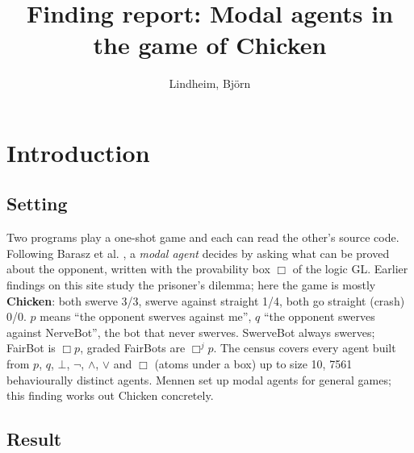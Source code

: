 \documentclass{article}
\title{Finding report: Modal agents in the game of Chicken}
\author{Lindheim, Björn}
\date{}
\begin{document}
\maketitle
\section{Introduction}
\label{sec:chicken-modal-agents}

\subsection*{Setting}

Two programs play a one-shot game and each can read the other's source code. Following Barasz et
al. \cite{barasz2014robust}, a \emph{modal agent} decides by asking what can be proved about the opponent,
written with the provability box $\Box$ of the logic GL. Earlier findings on this site study the
prisoner's dilemma; here the game is mostly \textbf{Chicken}: both swerve 3/3, swerve against straight
1/4, both go straight (crash) 0/0. $p$ means ``the opponent swerves against me'', $q$ ``the opponent
swerves against NerveBot'', the bot that never swerves. SwerveBot always swerves; FairBot is
$\Box p$, graded FairBots are $\Box^j p$. The census covers every agent built from $p$, $q$, $\bot$,
$\neg$, $\wedge$, $\vee$ and $\Box$ (atoms under a box) up to size 10, 7561 behaviourally distinct
agents. Mennen \cite{mennen2017modal} set up modal agents for general games; this finding works out
Chicken concretely.

\subsection*{Result}
\end{document}
